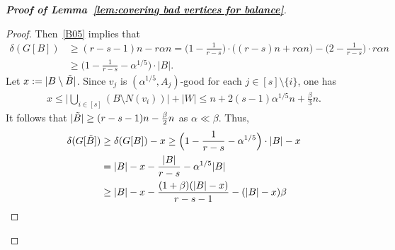 \documentclass[11pt, a4paper]{article}
\theoremstyle{definition}
\newcommand{\eps}{\varepsilon}
\newcommand{\<}{\subseteq}
\newcommand{\de}{\delta}
\begin{document}
\begin{proof}[{\bf Proof of Lemma~\ref{lem:covering bad vertices for balance}}]
\begin{proof}
Then~\ref{B05} implies that 
\begin{align*}
\de(G[B])&\ge (r-s-1)n-r\alpha n=\Big(1-\frac{1}{r-s}\Big)\cdot\big((r-s)n+r\alpha n\big)-\Big(2-\frac{1}{r-s}\Big)\cdot r\alpha n\\
&\ge \Big(1-\frac{1}{r-s}-\alpha^{1/5}\Big)\cdot|B|.
\end{align*}
Let $x:=|B\setminus \Tilde{B}|$. {Since $v_j$ is $(\alpha^{1/5},A_j)$-good for each $j\in [s]\setminus \{i\}$, one has  
\begin{align}\label{eq:x}
    x\leq \Big|\bigcup_{i\in [s]}(B\setminus N(v_i))\Big|+|W|\leq  n+2(s-1)\alpha^{1/5} n+\frac{\beta}{3} n.
\end{align}
It follows that 
$|\Tilde{B}|\geq (r-s-1)n-\frac{\beta}{2}n$ as $\alpha\ll\beta$.} %
Thus, \allowdisplaybreaks
\begin{align*}
\de(G[\Tilde{B}])&\ge \de(G[B])-x\ge \Big(1-\frac{1}{r-s}-\alpha^{1/5}\Big)\cdot|B|-x\\
&=|B|-x-\frac{|B|}{r-s}-\alpha^{1/5}|B|\\
&\ge|B|-x-\frac{(1+\beta)(|B|-x)}{r-s-1}-(|B|-x)\beta \\

\end{align*}
\end{proof}
\end{proof}
\end{document}

